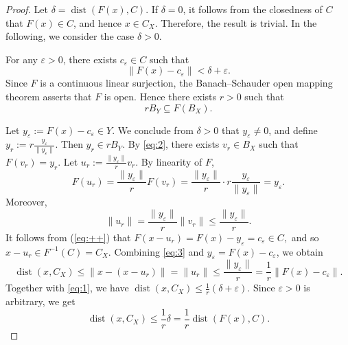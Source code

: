 \documentclass[10pt,a4paper]{amsart}
\begin{document}
\begin{proof}
	Let $\delta = \operatorname{dist}(F(x), C)$. 
	If \(\delta=0\),  it follows from   the closedness of  \(C\)   that 
	 \(F(x)\in C\), and hence \(x\in C_X\). Therefore, the result is trivial. In the following, we consider the case \(\delta>0\).
	
	
	
	
	For any $\varepsilon > 0$,   there exists $c_\varepsilon \in C$ such that
	\begin{equation}\label{eq:1}
		\|F(x) - c_\varepsilon\| < \delta + \varepsilon .
	\end{equation}
	Since $F$ is a continuous linear surjection, the Banach--Schauder open mapping theorem asserts that $F$ is open. Hence there exists $r>0$ such that
	\begin{equation}\label{eq:2}
		r B_Y \subseteq F(B_X).
	\end{equation}
 
	
	Let $y_\varepsilon := F(x) - c_\varepsilon \in Y$.	We conclude from  \(\delta>0\)  that    $y_\varepsilon \neq 0$,  and define
$	y_r := r \frac{y_\varepsilon}{\|y_\varepsilon\|}.$
	Then $y_r \in r B_Y$. By \eqref{eq:2}, there exists $v_r \in B_X$ such that $F(v_r) = y_r$. Let
$	u_r := \frac{\|y_\varepsilon\|}{r} v_r.$
	By linearity of $F$,
	\begin{equation}\label{eq:++}
	F(u_r) = \frac{\|y_\varepsilon\|}{r} F(v_r) = \frac{\|y_\varepsilon\|}{r} \cdot r \frac{y_\varepsilon}{\|y_\varepsilon\|} = y_\varepsilon.
	\end{equation}
	Moreover,
	\begin{equation}\label{eq:3}
		\|u_r\| = \frac{\|y_\varepsilon\|}{r} \|v_r\| \leq \frac{\|y_\varepsilon\|}{r} .
	\end{equation}
It follows from  (\ref{eq:++})  that  $	F(x - u_r) = F(x) - y_\varepsilon = c_\varepsilon \in C,$
and	so $x - u_r \in F^{-1}(C) = C_X$. Combining \eqref{eq:3} and $y_\varepsilon = F(x) - c_\varepsilon$, we obtain
	\begin{equation}\label{eq:4}
		\operatorname{dist}(x, C_X) \le \|x - (x - u_r)\| = \|u_r\| \leq \frac{\|y_\varepsilon\|}{r} = \frac{1}{r} \|F(x) - c_\varepsilon\|.
	\end{equation}
	Together with \eqref{eq:1}, we have
$	\operatorname{dist}(x, C_X) \le \frac{1}{r} (\delta + \varepsilon).$
	Since $\varepsilon > 0$ is arbitrary,  we get
	\[
	\operatorname{dist}(x, C_X) \le \frac{1}{r} \delta = \frac{1}{r} \operatorname{dist}(F(x), C).
	\]
\end{proof}
\end{document}
